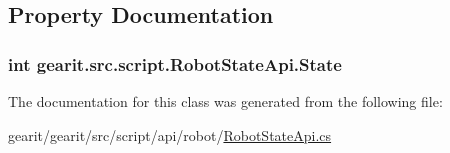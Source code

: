 \subsection{Property Documentation}
\hypertarget{classgearit_1_1src_1_1script_1_1_robot_state_api_a5fcb48cbaaba494ea5f5368df4cdb6bf}{
\subsubsection[{State}]{\setlength{\rightskip}{0pt plus 5cm}int gearit.\+src.\+script.\+Robot\+State\+Api.\+State\hspace{0.3cm}{\ttfamily [get]}}}\label{classgearit_1_1src_1_1script_1_1_robot_state_api_a5fcb48cbaaba494ea5f5368df4cdb6bf}


The documentation for this class was generated from the following file\+:\begin{DoxyCompactItemize}
\item 
gearit/gearit/src/script/api/robot/\hyperlink{_robot_state_api_8cs}{Robot\+State\+Api.\+cs}\end{DoxyCompactItemize}
